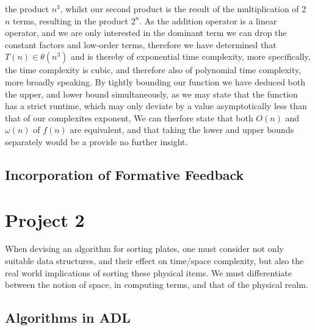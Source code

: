 \documentclass[a4paper]{article}
\begin{document}
the product $n^3$, whilst our second product is the result of the multiplication of 2 $n$ terms, resulting in the product $2^n$. 
As the addition operator is a linear operator, and we are only interested in the dominant term we can drop the constant factors and low-order terms, therefore
we have determined that $T(n) \in \theta (n^3)$ and is thereby of exponential time complexity, more specifically,
the time complexity is cubic, and therefore also of polynomial time complexity, more broadly speaking.
By tightly bounding our function we have deduced both the upper, and lower bound simultaneously, 
as we may state that the function has a strict runtime, which may only deviate by a value asymptotically less than that of our complexites exponent,  We can therfore 
state that both $O(n)$ and $\omega(n)$ of $f(n)$ are equivalent, and that taking the lower and upper bounds separately would be a provide no further insight. \\



\subsection{Incorporation of Formative Feedback}



\newpage







\section{Project 2}
When devising an algorithm for sorting plates, one must consider not only suitable data structures,
and their effect on time/space complexity, but also the real world implications of sorting these physical
items. We must differentiate between the notion of space, in computing terms, and that of the physical realm.\\

\subsection{Algorithms in ADL}
\end{document}
